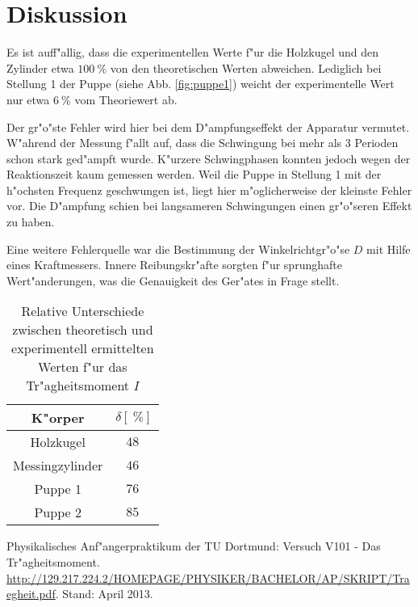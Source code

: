 \section{Diskussion}
\label{diskussion}
Es ist auff"allig, dass die experimentellen Werte f"ur die Holzkugel und den Zylinder etwa $\SI{100}{\percent}$ von den theoretischen Werten abweichen.
Lediglich bei Stellung 1 der Puppe (siehe Abb. \ref{fig:puppe1}) weicht der experimentelle Wert nur etwa $\SI{6}{\percent}$ vom Theoriewert ab.

Der gr"o"ste Fehler wird hier bei dem D"ampfungseffekt der Apparatur vermutet.
W"ahrend der Messung f"allt auf, dass die Schwingung bei mehr als 3 Perioden schon stark ged"ampft wurde.
K"urzere Schwingphasen konnten jedoch wegen der Reaktionszeit kaum gemessen werden.
Weil die Puppe in Stellung 1 mit der h"ochsten Frequenz geschwungen ist, liegt hier m"oglicherweise der kleinste Fehler vor.
Die D"ampfung schien bei langsameren Schwingungen einen gr"o"seren Effekt zu haben.

Eine weitere Fehlerquelle war die Bestimmung der Winkelrichtgr"o"se $D$ mit Hilfe eines Kraftmessers.
Innere Reibungskr"afte sorgten f"ur sprunghafte Wert"anderungen, was die Genauigkeit des Ger"ates in Frage stellt.

\begin{table}[h!]
	\begin{center}
		\caption{Relative Unterschiede zwischen theoretisch und experimentell ermittelten Werten f"ur das Tr"agheitsmoment $I$\label{tabelle:unterschiede}}
		\begin{tabular}{|c||c|}
			\hline
			K"orper & $\delta [\SI{}{\percent}]$ \\
			\hline 
			\hline
			Holzkugel & $\SI{48}{}$ \\
			Messingzylinder & $\SI{46}{}$ \\
			Puppe 1 & $\SI{76}{}$ \\
			Puppe 2 & $\SI{85}{}$ \\
			\hline 
		\end{tabular}
	\end{center}
\end{table}
	

\begin{thebibliography}{9}
	 Physikalisches Anf"angerpraktikum der TU Dortmund: Versuch V101 - Das Tr"agheitsmoment. \url{http://129.217.224.2/HOMEPAGE/PHYSIKER/BACHELOR/AP/SKRIPT/Traegheit.pdf}. Stand: April 2013.
\end{thebibliography}
